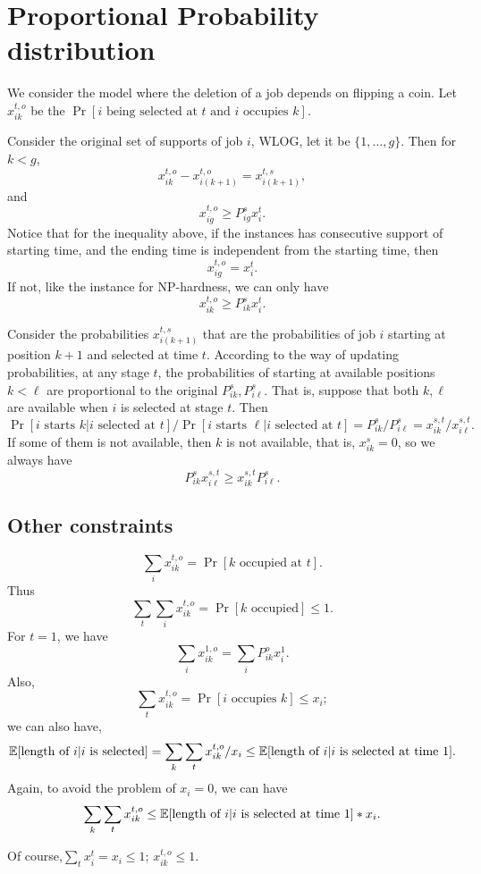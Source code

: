 \documentclass{article}
\newcommand{\E}{\mathbb{E}}
\begin{document}
\section{Proportional Probability distribution}
We consider the model where the deletion of a job depends on flipping a coin.
Let $x_{ik}^{t,o}$ be the
$\Pr[\text{$i$ being selected at $t$ and $i$ occupies $k$}]$.

Consider the original set of supports of job $i$, WLOG, let it be $\{1,\ldots,g\}$.
Then  for $k<g$,
\[x_{ik}^{t,o}-x_{i(k+1)}^{t,o}=x_{i(k+1)}^{t,s},\]
and 
\[x_{ig}^{t,o}\geq P_{ig}^{s}x_i^t.\]
Notice that for the inequality above, if the instances has consecutive support of starting time, and the ending time is independent from the starting time, then 
\[x_{ig}^{t,o}=x_i^t.\]
If not, like the instance for NP-hardness, we can only have 
\[x_{ik}^{t,o}\geq P_{ik}^{s}x_i^t.\]

Consider the probabilities $x_{i(k+1)}^{t,s}$ that are the probabilities of job $i$ starting at position $k+1$ and selected at time $t$.
According to the way of updating probabilities, at any stage $t$, the probabilities of starting at available positions $k<\ell$ are proportional to the original $P_{ik}^{s},P_{i\ell}^{s}$.
That is, suppose that both $k,\ell$ are available when $i$ is selected at stage $t$.
Then
\[\Pr[\text{$i$ starts $k$}|\text{$i$ selected at $t$}]/\Pr[\text{$i$ starts $\ell$}|\text{$i$ selected at $t$}]=P_{ik}^{s}/P_{i\ell}^{s}= x_{ik}^{s,t}/x_{i\ell}^{s,t}.\]
If some of them is not available, then $k$ is not available, that is, $x_{ik}^{s}=0$, so we always have 
\[P_{ik}^{s}x_{i\ell}^{s,t}\geq x_{ik}^{s,t}P_{i\ell}^{s}.\]
\subsection{Other constraints}
\[\sum_{i}x_{ik}^{t,o}=\Pr[\text{$k$ occupied at $t$}].\]
Thus 
\[\sum_{t}\sum_{i}x_{ik}^{t,o}=\Pr[\text{$k$ occupied}]\leq 1.\]
For $t=1$, we have
\[\sum_{i}x_{ik}^{1,o}=\sum_{i}P_{ik}^{o}x_i^1.\]
Also,
\[\sum_{t}x_{ik}^{t,o}=\Pr[\text{$i$ occupies $k$}]\leq x_i;\]
we can also have, 
\[\E[\text{length of $i$}|\text{$i$ is selected}]=\sum_{k}\sum_{t}x_{ik}^{t,o}/x_i\leq \E[\text{length of $i$|\text{$i$ is selected at time $1$}}].\]
Again, to avoid the problem of $x_i=0$, we can have
\[\sum_{k}\sum_{t}x_{ik}^{t,o}\leq \E[\text{length of $i$|\text{$i$ is selected at time $1$}}]*x_i.\]

Of course,$\sum_{t}x_i^t = x_i\leq 1$;
$x_{ik}^{t,o}\leq 1$.
\end{document}
